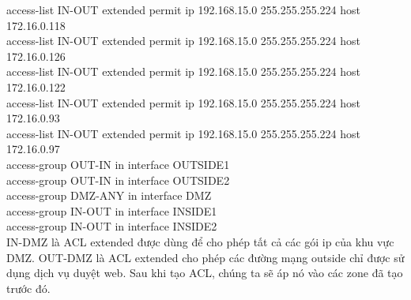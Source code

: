 \documentclass[12pt,a4paper]{report}
\begin{document}
{\hspace*{1cm}access-list IN-OUT extended permit ip 192.168.15.0 255.255.255.224 host 172.16.0.118\\
\hspace*{1cm}access-list IN-OUT extended permit ip 192.168.15.0 255.255.255.224 host 172.16.0.126\\
\hspace*{1cm}access-list IN-OUT extended permit ip 192.168.15.0 255.255.255.224 host 172.16.0.122\\
\hspace*{1cm}access-list IN-OUT extended permit ip 192.168.15.0 255.255.255.224 host 172.16.0.93\\
\hspace*{1cm}access-list IN-OUT extended permit ip 192.168.15.0 255.255.255.224 host 172.16.0.97\\
\hspace*{1cm}access-group OUT-IN in interface OUTSIDE1\\
\hspace*{1cm}access-group OUT-IN in interface OUTSIDE2 \\
\hspace*{1cm}access-group DMZ-ANY in interface DMZ \\
\hspace*{1cm}access-group IN-OUT in interface INSIDE1\\
\hspace*{1cm}access-group IN-OUT in interface INSIDE2\\}
\hspace*{1cm}IN-DMZ là ACL extended được dùng để cho phép tất cả các gói ip của khu vực DMZ. OUT-DMZ là ACL extended cho phép các đường mạng outside chỉ được sử dụng dịch vụ duyệt web. Sau khi tạo ACL, chúng ta sẽ áp nó vào các zone đã tạo trước đó.\\
\end{document}
